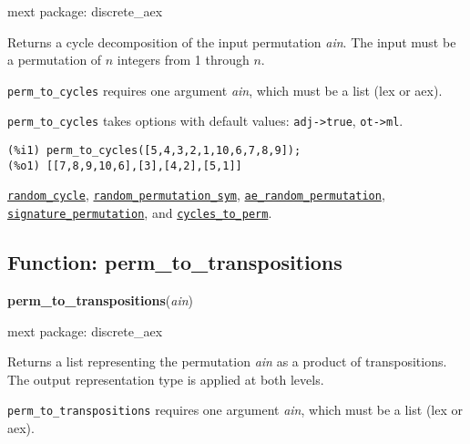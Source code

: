 \documentclass[]{article}
\begin{document}
\noindent mext package: discrete\_aex



\vspace{5 pt}
Returns a cycle decomposition of the input permutation {\it ain}. The input must be a permutation of $n$ integers from 1 through $n$. 

\vspace{5 pt}

   {\tt perm\_to\_cycles} requires one argument {\it ain}, which must be a list (lex or aex).


\vspace{5 pt}

{\tt perm\_to\_cycles} takes options with default values: {\tt adj->true}, {\tt ot->ml}.
\vspace{5 pt}


\begin{Verbatim}[frame=single]
(%i1) perm_to_cycles([5,4,3,2,1,10,6,7,8,9]);
(%o1) [[7,8,9,10,6],[3],[4,2],[5,1]]
\end{Verbatim}


  \hyperlink{random_cycle}{{\tt random\_cycle}}, \hyperlink{random_permutation_sym}{{\tt random\_permutation\_sym}}, \hyperlink{ae_random_permutation}{{\tt ae\_random\_permutation}}, \hyperlink{signature_permutation}{{\tt signature\_permutation}}, and \hyperlink{cycles_to_perm}{{\tt cycles\_to\_perm}}.

\vspace{5 pt}


\subsection{Function: perm\_to\_transpositions\label{sec:perm_to_transpositions}}
\hypertarget{perm_to_transpositions}{}
{\bf perm\_to\_transpositions}({\it ain})


\noindent mext package: discrete\_aex



\vspace{5 pt}
Returns a list representing the permutation {\it ain} as a product of transpositions. The output representation type is applied at both levels. 

\vspace{5 pt}

   {\tt perm\_to\_transpositions} requires one argument {\it ain}, which must be a list (lex or aex).
\end{document}
